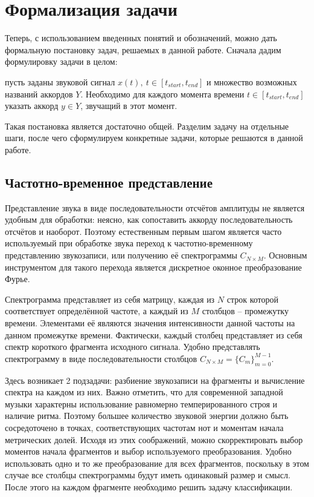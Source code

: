 \section{Формализация задачи} \label{sectT_task}

Теперь, с использованием введенных понятий и обозначений, можно дать
формальную постановку задач, решаемых в данной работе. Сначала дадим
формулировку задачи в целом:

пусть заданы звуковой сигнал $x(t),~t \in [t_{start}, t_{end}]$ и множество
возможных названий аккордов $Y$. Необходимо для каждого момента времени $t \in
[t_{start}, t_{end}]$ указать аккорд $y \in Y$, звучащий в этот момент.

Такая постановка является достаточно общей. Разделим задачу на отдельные шаги,
после чего сформулируем конкретные задачи, которые решаются в данной работе.

\subsection{Частотно-временное представление}

Представление звука в виде последовательности отсчётов амплитуды не является
удобным для обработки: неясно, как сопоставить аккорду последовательность
отсчётов и наоборот. Поэтому естественным первым шагом является часто
используемый при обработке звука переход к частотно-временному представлению
звукозаписи, или получению её спектрограммы $C_{N \times M}$. Основным
инструментом для такого перехода является дискретное оконное преобразование
Фурье.

Спектрограмма представляет из себя матрицу, каждая из $N$ строк которой
соответствует определённой частоте, а каждый из $M$ столбцов -- промежутку
времени. Элементами её являются значения интенсивности данной частоты на данном
промежутке времени. Фактически, каждый столбец представляет из себя спектр
короткого фрагмента исходного сигнала. Удобно представлять спектрограмму в виде
последовательности столбцов $C_{N \times M} = \{C_m\}_{m=0}^{M-1}$.

Здесь возникает 2 подзадачи: разбиение звукозаписи на фрагменты и вычисление
спектра на каждом из них. Важно отметить, что для современной западной музыки
характерны использование равномерно темперированного строя и наличие ритма.
Поэтому большее количество звуковой энергии должно быть сосредоточено в точках,
соответствующих частотам нот и моментам начала метрических долей. Исходя из этих
соображений, можно скорректировать выбор моментов начала фрагментов и выбор
используемого преобразования. Удобно использовать одно и то же преобразование
для всех фрагментов, поскольку в этом случае все столбцы спектрограммы будут
иметь одинаковый размер и смысл. После этого на каждом фрагменте необходимо
решить задачу классификации.


